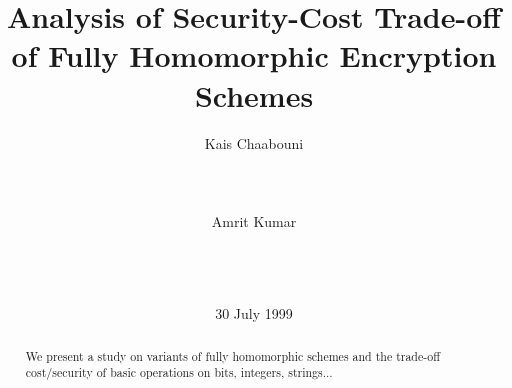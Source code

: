 \documentclass{acm_proc_article-sp}
\begin{document}
\title{Analysis of Security-Cost Trade-off of Fully Homomorphic Encryption Schemes}

%
%
%
%

%
\author{
\alignauthor
Kais Chaabouni \\
       \\
       \\
       \\
\alignauthor 
Amrit Kumar\\
       \\
       \\
       \\
}


\date{30 July 1999}
\maketitle
\begin{abstract}
We present a study on variants of fully homomorphic schemes and the trade-off cost/security of basic operations on bits, integers, strings... 
\end{abstract}
\end{document}
